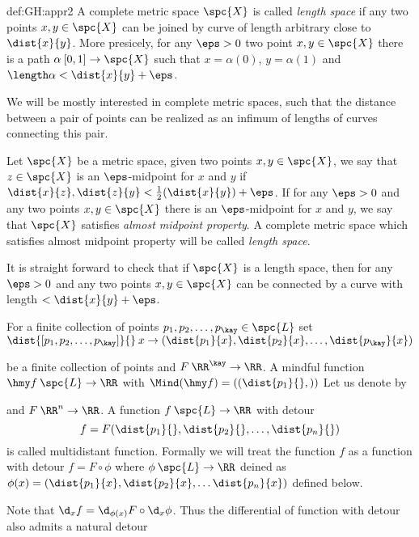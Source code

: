 {\begin{subthm}{def:GH:appr2}
A complete metric space $\spc{X}$ is called \emph{length space} if any two points $x,y\in \spc{X}$ can be joined by curve of length arbitrary close to $\dist{x}{y}$.
More presicely, for any $\eps>0$ two point $x,y\in \spc{X}$ there is a path $\alpha\:[0,1]\to\spc{X}$  such that $x=\alpha(0)$, $y=\alpha(1)$ and $\length\alpha<\dist{x}{y}+\eps$.

We will be mostly interested in complete metric spaces, such that the distance between a pair of points can be realized as an infimum of lengths of curves connecting this pair.

Let $\spc{X}$ be a metric space, given two points $x,y\in \spc{X}$, we say that $z\in \spc{X}$ is an $\eps$-midpoint for $x$ and $y$ if $\dist{x}{z},\dist{z}{y}<\tfrac12(\dist{x}{y})+\eps$.
If for any $\eps>0$ and any two points $x,y\in \spc{X}$ there is an $\eps$-midpoint for $x$ and $y$,
we say that $\spc{X}$ satisfies \emph{almost midpoint property}.
A complete metric space which satisfies almost midpoint property will be called \emph{length space}.

It is straight forward to check that if $\spc{X}$ is a length space, then for any $\eps>0$ and any two points $x,y\in \spc{X}$ can be connected by a curve with length $<\dist{x}{y}+\eps$.









For a finite collection of points 
$p_1,p_2,\dots,p_\kay\in\spc{L}$ 
set
$\dist{[p_1,p_2,\dots,p_\kay]}{}\:x\to(\dist{p_1}{x},\dist{p_2}{x},\dots,\dist{p_\kay}{x})$ 


be a finite collection of points and $F\:\RR^\kay\to\RR$.
A mindful function
$\hmy f\:\spc{L}\to\RR$ with $\Mind(\hmy f)=((\dist{p_1}{},))$
Let us denote by 

and $F\:\RR^n\to\RR$.
A function $f\:\spc{L}\to\RR$ with detour
$$f=F(\dist{p_1}{},\dist{p_2}{},\dots,\dist{p_n}{})$$ is called multidistant function.
Formally we will treat the function $f$ as a function with detour $f=F\circ\phi$ where $\phi\:\spc{L}\to\RR$ deined as $\phi(x)=(\dist{p_1}{x},\dist{p_2}{x},\dots\dist{p_n}{x})$ defined below.

Note that $\d_xf=\d_{\phi(x)}F\circ\d_x\phi$.
Thus the differential of function with detour also admits a natural detour 

















\end{subthm}}
